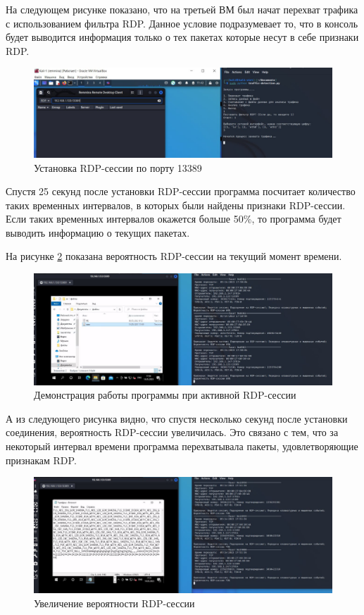 \documentclass[bachelor, och, coursework]{SCWorks}
\begin{document}
На следующем рисунке показано, что на третьей ВМ был начат перехват трафика с использованием фильтра RDP. Данное условие подразумевает то,
что в консоль будет выводится информация только о тех пакетах которые несут в себе признаки RDP.

\begin{figure}[H]
  \centering
  \includegraphics[width=1\textwidth]{photo/rdpport2.jpg}
  \caption{Установка RDP-сессии по порту 13389}
  \label{rdpport2}
\end{figure}

Спустя 25 секунд после установки RDP-сессии программа посчитает количество таких временных интервалов, в которых были найдены
признаки RDP-сессии. Если таких временных интервалов окажется больше 50\%, то программа будет выводить информацию о текущих пакетах.

На рисунке \ref{rdpport3} показана вероятность RDP-сессии на текущий момент времени.

\begin{figure}[H]
  \centering
  \includegraphics[width=1\textwidth]{photo/rdpport3.jpg}
  \caption{Демонстрация работы программы при активной RDP-сессии}
  \label{rdpport3}
\end{figure}

А из следующего рисунка видно, что спустя несколько секунд после установки соединения, вероятность RDP-сессии увеличилась.
Это связано с тем, что за некоторый интервал времени программа перехватывала пакеты, удовлетворяющие признакам RDP.


\begin{figure}[H]
  \centering
  \includegraphics[width=1\textwidth]{photo/rdpport4.jpg}
  \caption{Увеличение вероятности RDP-сессии}
  \label{rdpport4}
\end{figure}
\end{document}
